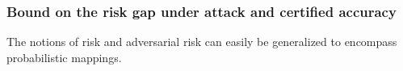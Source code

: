 

\subsubsection{Bound on the risk gap under attack and certified accuracy}

The notions of risk and adversarial risk can easily be generalized to encompass probabilistic mappings. %

